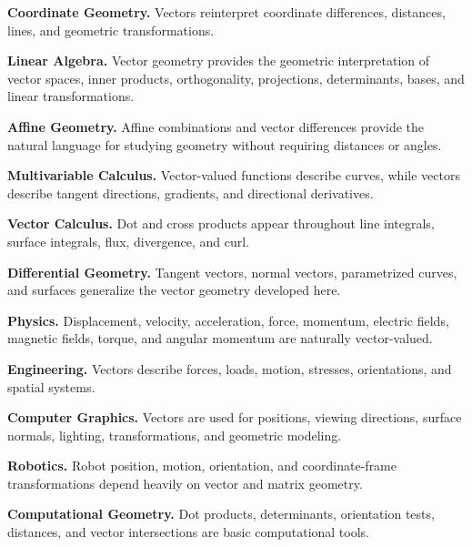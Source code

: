 \begin{applicationbox}
\textbf{Coordinate Geometry.}
Vectors reinterpret coordinate differences, distances, lines, and geometric
transformations.

\medskip

\textbf{Linear Algebra.}
Vector geometry provides the geometric interpretation of vector spaces,
inner products, orthogonality, projections, determinants, bases, and linear
transformations.

\medskip

\textbf{Affine Geometry.}
Affine combinations and vector differences provide the natural language for
studying geometry without requiring distances or angles.

\medskip

\textbf{Multivariable Calculus.}
Vector-valued functions describe curves, while vectors describe tangent
directions, gradients, and directional derivatives.

\medskip

\textbf{Vector Calculus.}
Dot and cross products appear throughout line integrals, surface integrals,
flux, divergence, and curl.

\medskip

\textbf{Differential Geometry.}
Tangent vectors, normal vectors, parametrized curves, and surfaces generalize
the vector geometry developed here.

\medskip

\textbf{Physics.}
Displacement, velocity, acceleration, force, momentum, electric fields,
magnetic fields, torque, and angular momentum are naturally vector-valued.

\medskip

\textbf{Engineering.}
Vectors describe forces, loads, motion, stresses, orientations, and spatial
systems.

\medskip

\textbf{Computer Graphics.}
Vectors are used for positions, viewing directions, surface normals,
lighting, transformations, and geometric modeling.

\medskip

\textbf{Robotics.}
Robot position, motion, orientation, and coordinate-frame transformations
depend heavily on vector and matrix geometry.

\medskip

\textbf{Computational Geometry.}
Dot products, determinants, orientation tests, distances, and vector
intersections are basic computational tools.
\end{applicationbox}

